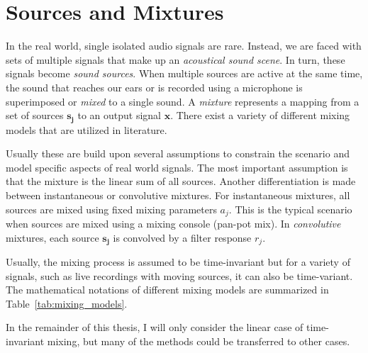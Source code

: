 \hypertarget{sources-and-mixtures}{%
\section{Sources and Mixtures}\label{sources-and-mixtures}}

In the real world, single isolated audio signals are rare.
Instead, we are faced with sets of multiple signals that make up an \emph{acoustical sound scene}.
In turn, these signals become \emph{sound sources}.
When multiple sources are active at the same time, the sound that reaches our ears or is recorded using a microphone is superimposed or \emph{mixed} to a single sound.
A \emph{mixture} represents a mapping from a set of sources \(\mathbf{s_j}\) to an output signal \(\mathbf{x}\).
There exist a variety of different mixing models that are utilized in literature.
\par
Usually these are build upon several assumptions to constrain the scenario and model specific aspects of real world signals.
The most important assumption is that the mixture is the linear sum of all sources.
Another differentiation is made between instantaneous or convolutive mixtures.
For instantaneous mixtures, all sources are mixed using fixed mixing parameters \(a_j\).
This is the typical scenario when sources are mixed using a mixing console (pan-pot mix).
In \emph{convolutive} mixtures, each source \(\mathbf{s_j}\) is convolved by a filter response \(r_j\).
\par
Usually, the mixing process is assumed to be time-invariant but for a variety of signals, such as live recordings with moving sources, it can also be time-variant.
The mathematical notations of different mixing models are summarized in Table~\ref{tab:mixing_models}.
\par
In the remainder of this thesis, I will only consider the linear case of time-invariant mixing, but many of the methods could be transferred to other cases.

